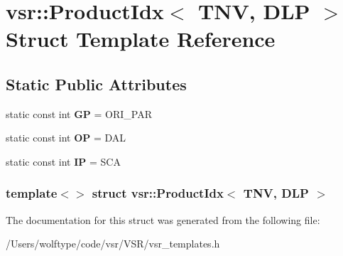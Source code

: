 \hypertarget{structvsr_1_1_product_idx_3_01_t_n_v_00_01_d_l_p_01_4}{\section{vsr\-:\-:Product\-Idx$<$ T\-N\-V, D\-L\-P $>$ Struct Template Reference}
\label{structvsr_1_1_product_idx_3_01_t_n_v_00_01_d_l_p_01_4}
}
\subsection*{Static Public Attributes}
\begin{DoxyCompactItemize}
\item 
\hypertarget{structvsr_1_1_product_idx_3_01_t_n_v_00_01_d_l_p_01_4_a5c8da31e15ad76d72300298d9b5622d0}{static const int {\bfseries G\-P} = O\-R\-I\-\_\-\-P\-A\-R}\label{structvsr_1_1_product_idx_3_01_t_n_v_00_01_d_l_p_01_4_a5c8da31e15ad76d72300298d9b5622d0}

\item 
\hypertarget{structvsr_1_1_product_idx_3_01_t_n_v_00_01_d_l_p_01_4_a47d908bd7e8ca304a2336cbc623a8f48}{static const int {\bfseries O\-P} = D\-A\-L}\label{structvsr_1_1_product_idx_3_01_t_n_v_00_01_d_l_p_01_4_a47d908bd7e8ca304a2336cbc623a8f48}

\item 
\hypertarget{structvsr_1_1_product_idx_3_01_t_n_v_00_01_d_l_p_01_4_a6db4093ec0616b5d0128575fcf268750}{static const int {\bfseries I\-P} = S\-C\-A}\label{structvsr_1_1_product_idx_3_01_t_n_v_00_01_d_l_p_01_4_a6db4093ec0616b5d0128575fcf268750}

\end{DoxyCompactItemize}
\subsubsection*{template$<$$>$ struct vsr\-::\-Product\-Idx$<$ T\-N\-V, D\-L\-P $>$}



The documentation for this struct was generated from the following file\-:\begin{DoxyCompactItemize}
\item 
/\-Users/wolftype/code/vsr/\-V\-S\-R/vsr\-\_\-templates.\-h\end{DoxyCompactItemize}
